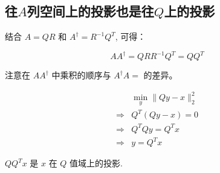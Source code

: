 \subsection{往$A$列空间上的投影也是往$Q$上的投影}

结合 $A=Q R$ 和 $A^{\dagger}=R^{-1} Q^{T}$, 可得：

$$
A A^{\dagger}=Q R R^{-1} Q^{T}=Q Q^{T}
$$

\begin{remark}
    注意在 $A A^{\dagger}$ 中乘积的顺序与 $A^{\dagger} A=$ 的差异。
\end{remark}

$$
\begin{aligned}
&\min _{y}\|Q y-x\|_{2}^{2}\\
 \Rightarrow& Q^{T}(Q y-x)=0 \\
\Rightarrow& Q^{T} Q y=Q^{T} x\\ 
\Rightarrow & y=Q^{T} x
\end{aligned}
$$

$Q Q^{T} x$ 是 $x$ 在 $Q$ 值域上的投影.

